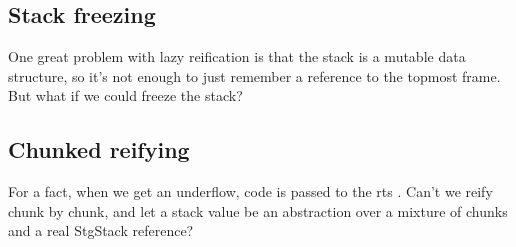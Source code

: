 \subsection{Stack freezing}

One great problem with lazy reification is that the stack is a
mutable data structure, so it's not enough to just remember a reference
to the topmost frame. But what if we could freeze the stack?

\subsection{Chunked reifying}

For a fact, when we get an underflow, code is passed to the rts
\cite{github_underflow_frame}. Can't we reify chunk by chunk,
and let a stack value be an abstraction over a mixture of chunks and
a real StgStack reference?

